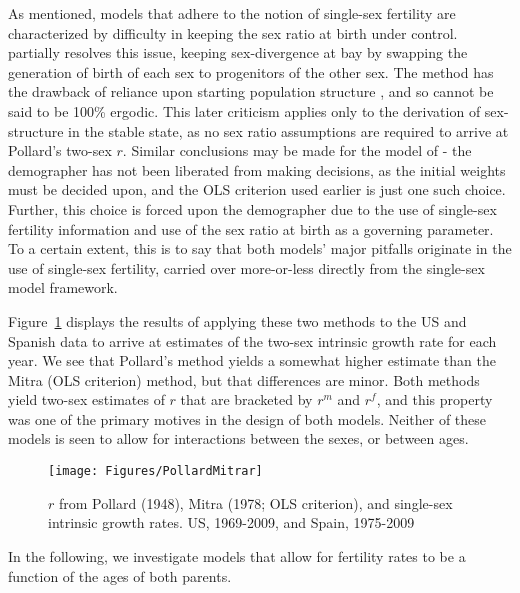 \FloatBarrier
As mentioned, models that adhere to the notion of single-sex fertility are
characterized by difficulty in keeping the sex ratio at birth under control.
\citet{pollard1948measurement} partially resolves this issue, keeping
sex-divergence at bay by swapping the generation of birth of each sex to
progenitors of the other sex. The method has the drawback of reliance upon
starting population structure \citep{yntema1952mathematical}, and so cannot be
said to be 100\% ergodic. This later criticism applies only to the derivation of
sex-structure in the stable state, as no sex ratio assumptions are required to arrive at Pollard's two-sex
$r$. Similar conclusions may be made for the model of
\citet{mitra1978derivation}- the demographer has not been liberated from making
decisions, as the initial weights must be decided upon, and the OLS criterion
used earlier is just one such choice. Further, this choice is forced upon the
demographer due to the use of single-sex fertility information and use of the
sex ratio at birth as a governing parameter. To a certain extent, this is to say
that both models' major pitfalls originate in the use of single-sex fertility,
carried over more-or-less directly from the single-sex model framework.

Figure~\ref{fig:PollardMitrar} displays the results of applying these two
methods to the US and Spanish data to arrive at estimates of the two-sex 
intrinsic growth rate for each year. We see that
Pollard's method yields a somewhat higher estimate than the Mitra (OLS
criterion) method, but that differences are minor. Both methods yield two-sex
estimates of $r$ that are bracketed by $r^m$ and $r^f$, and this property was
one of the primary motives in the design of both models. Neither of these models
is seen to allow for interactions between the sexes, or between ages.

\begin{figure}[ht!]
        \centering  
          \caption{$r$ from Pollard (1948), Mitra (1978; OLS criterion),
          and single-sex intrinsic growth rates. US, 1969-2009, and Spain, 1975-2009}
           \texttt{[image: Figures/PollardMitrar]}
          \label{fig:PollardMitrar}
\end{figure}

In the following, we investigate models that allow for fertility
rates to be a function of the ages of both parents.

\FloatBarrier


